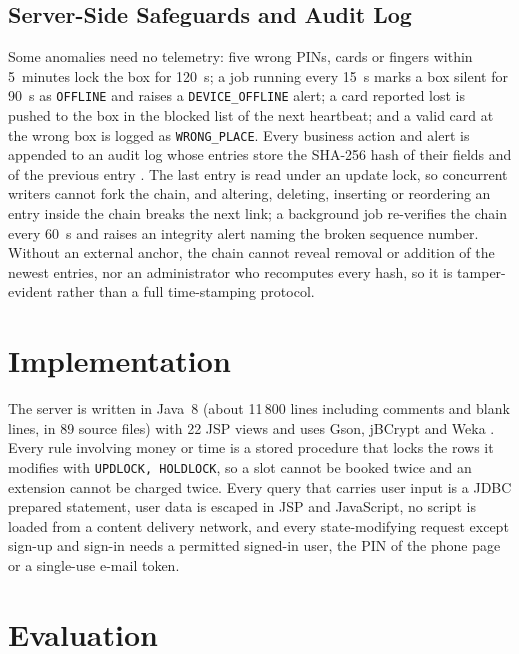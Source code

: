 \documentclass[sigconf,screen]{acmart}
\begin{document}
\subsection{Server-Side Safeguards and Audit Log}\label{sec:safeguards}

Some anomalies need no telemetry: five wrong PINs, cards or fingers within 5~minutes lock the box for 120~s; a job
running every 15~s marks a box silent for 90~s as \texttt{OFFLINE} and raises a \texttt{DEVICE\_OFFLINE} alert; a card
reported lost is pushed to the box in the blocked list of the next heartbeat; and a valid card at the wrong box is
logged as \texttt{WRONG\_PLACE}. Every business action and alert is appended to an audit log whose entries store the
SHA-256 hash of their fields and of the previous entry \cite{haber1991timestamp}. The
last entry is read under an update lock, so concurrent writers cannot fork the chain, and altering, deleting,
inserting or reordering an entry inside the chain breaks the next link; a background job re-verifies the chain every
60~s and raises an integrity alert naming the broken sequence number. Without an external anchor, the chain cannot
reveal removal or addition of the newest entries, nor an administrator who recomputes every hash, so it is
tamper-evident rather than a full time-stamping protocol.

\section{Implementation}\label{sec:impl}

The server is written in Java~8 (about 11\,800 lines including comments and blank lines, in 89 source files) with
22 JSP views and uses Gson, jBCrypt \cite{provos1999bcrypt} and Weka \cite{hall2009weka}. Every rule involving money
or time is a stored procedure that locks the rows it modifies with \texttt{UPDLOCK, HOLDLOCK}, so a slot cannot be
booked twice and an extension cannot be charged twice. Every query that carries user input is a JDBC prepared
statement, user data is escaped in JSP and JavaScript, no script is loaded from a content delivery network, and every
state-modifying request except sign-up and sign-in needs a permitted signed-in user, the PIN of the phone page or a
single-use e-mail token.

\section{Evaluation}\label{sec:ml}
\end{document}
